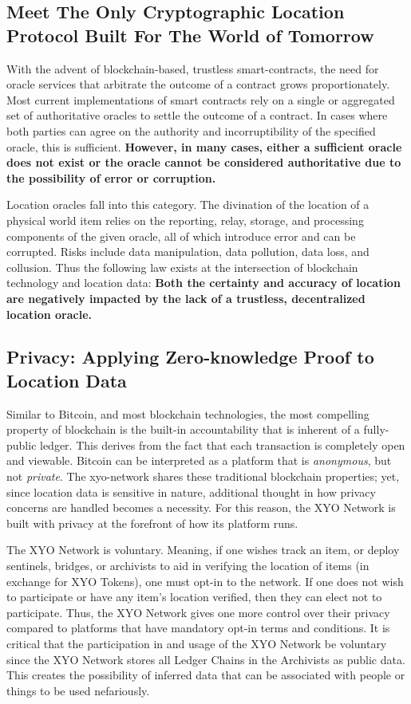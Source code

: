 \documentclass{article}
\begin{document}
\subsection {Meet The Only Cryptographic Location Protocol Built For The World of Tomorrow}
With the advent of blockchain-based, \gls{trustless} \glspl{smart-contract}, the need for \gls{oracle} services that arbitrate the outcome of a contract grows proportionately. Most current implementations of smart contracts rely on a single or aggregated set of authoritative oracles to settle the outcome of a contract. In cases where both parties can agree on the authority and incorruptibility of the specified oracle, this is sufficient. \textbf{However, in many cases, either a sufficient oracle does not exist or the oracle cannot be considered authoritative due to the possibility of error or corruption.}

Location oracles fall into this category. The divination of the location of a physical world item relies on the reporting, relay, storage, and processing components of the given oracle, all of which introduce error and can be corrupted. Risks include data manipulation, data pollution, data loss, and collusion. Thus the following law exists at the intersection of blockchain technology and location data: \textbf{Both the \gls{certainty} and \gls{accuracy} of location are negatively impacted by the lack of a \gls{trustless}, decentralized location oracle.}

\subsection{Privacy: Applying Zero-knowledge Proof to Location Data}

Similar to Bitcoin, and most blockchain technologies, the most compelling property of blockchain is the built-in accountability that is inherent of a fully-public ledger. This derives from the fact that each transaction is completely open and viewable. Bitcoin can be interpreted as a platform that is \textit{anonymous}, but not \textit{private}. The \Gls{xyo-network} shares these traditional blockchain properties; yet, since location data is sensitive in nature, additional thought in how privacy concerns are handled becomes a necessity. For this reason, the XYO Network is built with privacy at the forefront of how its platform runs.

The XYO Network is voluntary. Meaning, if one wishes track an item, or deploy \Glspl{sentinel}, \Glspl{bridge}, or \Glspl{archivist} to aid in verifying the location of items (in exchange for XYO Tokens), one must opt-in to the network. If one does not wish to participate or have any item's location verified, then they can elect not to participate. Thus, the XYO Network gives one more control over their privacy compared to platforms that have mandatory opt-in terms and conditions. It is critical that the participation in and usage of the XYO Network be voluntary since the XYO Network stores all Ledger Chains in the Archivists as public data. This creates the possibility of inferred data that can be associated with people or things to be used nefariously.
\end{document}
